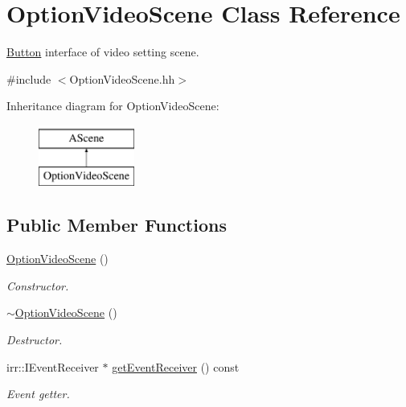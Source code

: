 \hypertarget{classOptionVideoScene}{}\section{Option\+Video\+Scene Class Reference}
\label{classOptionVideoScene}


\hyperlink{classButton}{Button} interface of video setting scene.  




{\ttfamily \#include $<$Option\+Video\+Scene.\+hh$>$}

Inheritance diagram for Option\+Video\+Scene\+:\begin{figure}[H]
\begin{center}
\leavevmode
\includegraphics[height=2.000000cm]{classOptionVideoScene}
\end{center}
\end{figure}
\subsection*{Public Member Functions}
\begin{DoxyCompactItemize}
\item 
\hyperlink{classOptionVideoScene_a4adc5d02ab700ef59733b19183769dea}{Option\+Video\+Scene} ()
\begin{DoxyCompactList}\small\item\em Constructor. \end{DoxyCompactList}\item 
\hyperlink{classOptionVideoScene_aaafd7499ea05590a0d61109ae7bcbf08}{$\sim$\+Option\+Video\+Scene} ()
\begin{DoxyCompactList}\small\item\em Destructor. \end{DoxyCompactList}\item 
irr\+::\+I\+Event\+Receiver $\ast$ \hyperlink{classOptionVideoScene_a84625e871c5176d7abc77a7f12c1472a}{get\+Event\+Receiver} () const
\begin{DoxyCompactList}\small\item\em Event getter. \end{DoxyCompactList}\end{DoxyCompactItemize}


